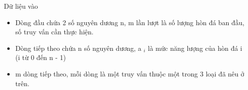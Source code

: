 Dữ liệu vào
\begin{itemize}
	\item     Dòng đầu chứa 2 số nguyên dương n, m lần lượt là số lượng hòn đá ban đầu, số truy vấn cần thực hiện.   
	\item     Dòng tiếp theo chứa n số nguyên dương, a    $_     i    $    là mức năng lượng của hòn đá i (i từ 0 đến n - 1)   
	\item     m dòng tiếp theo, mỗi dòng là một truy vấn thuộc một trong 3 loại đã nêu ở trên.   
\end{itemize}